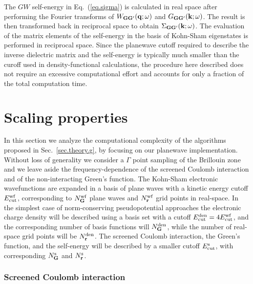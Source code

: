 \documentclass[twocolumn,prb,showpacs,superscriptaddress]{revtex4}
\def\w{\omega}
\def\q{{\bf q}}
\def\k{{\bf k}}
\def\G{{\bf G}}
\def\Gp{{\bf G^\prime}}
\def\r{{\bf r}}
\begin{document}
The $GW$ self-energy in Eq.\ (\ref{eq.sigma}) is calculated in real space
after performing the Fourier transforms of $W_{\G\Gp}(\q;\w)$ and $G_{\G\Gp}(\k;\w)$.
The result is then transformed back in reciprocal space to obtain
$\Sigma_{\G\Gp}(\k;\w)$. The evaluation of the matrix elements of the
self-energy in the basis of Kohn-Sham eigenstates is performed in reciprocal space.
Since the planewave cutoff required to describe the inverse dielectric
matrix and the self-energy is typically much smaller than the curoff used
in density-functional calculations,\cite{hl86} the procedure here described
does not require an excessive computational effort and accounts for only
a fraction of the total computation time.

\section{Scaling properties}\label{sec.scaling}

In this section we analyze the computational complexity of the algorithms
proposed in Sec.\ \ref{sec.theory.g}, by focusing on our planewave
implementation. Without loss of generality we consider a $\Gamma$ point sampling 
of the Brillouin zone and we leave aside the frequency-dependence of
the screened Coulomb interaction and of the non-interacting Green's function.
The Kohn-Sham electronic wavefunctions are expanded in a basis of plane waves
with a kinetic energy cutoff $E_{\rm cut}^{\rm wf}$, corresponding to
$N_\G^{\rm wf}$ plane waves and $N_\r^{\rm wf}$ grid points in real-space.
In the simplest case of norm-conserving pseudopotential approaches 
the electronic charge density will be described using a basis set with a cutoff
$E_{\rm cut}^{\rm den}=4E_{\rm cut}^{\rm wf}$, and the corresponding number of basis
functions will $N_\G^{\rm den}$, while the number of real-space grid points will be 
$N_\r^{\rm den}$. The screened Coulomb interaction, the Green's function,
and the self-energy will be described by a smaller cutoff $E_{\rm cut}^{\rm s}$,
with corresponding $N_\G^{\rm s}$ and $N_\r^{\rm s}$.

\subsubsection{Screened Coulomb interaction}\label{sec.coulomb.scaling}
\end{document}
